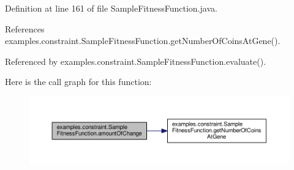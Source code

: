 Definition at line 161 of file Sample\-Fitness\-Function.\-java.



References examples.\-constraint.\-Sample\-Fitness\-Function.\-get\-Number\-Of\-Coins\-At\-Gene().



Referenced by examples.\-constraint.\-Sample\-Fitness\-Function.\-evaluate().



Here is the call graph for this function\-:
\nopagebreak
\begin{figure}[H]
\begin{center}
\leavevmode
\includegraphics[width=350pt]{classexamples_1_1constraint_1_1_sample_fitness_function_afef33c244dd2ad463b84cb88ed959184_cgraph}
\end{center}
\end{figure}


